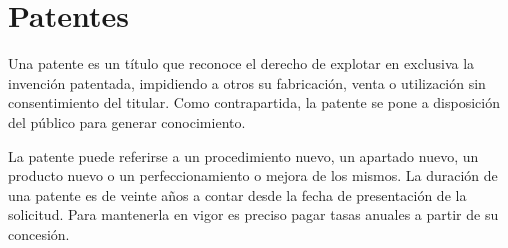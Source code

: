 \section{Patentes}

Una patente es un título que reconoce el derecho de explotar en exclusiva la invención patentada, impidiendo a otros su fabricación, venta o utilización sin consentimiento del titular. Como contrapartida, la patente se pone a disposición del público para generar conocimiento.

La patente puede referirse a un procedimiento nuevo, un apartado nuevo, un producto nuevo o un perfeccionamiento o mejora de los mismos. La duración de una patente es de veinte años a contar desde la fecha de presentación de la solicitud. Para mantenerla en vigor es preciso pagar tasas anuales a partir de su concesión.
